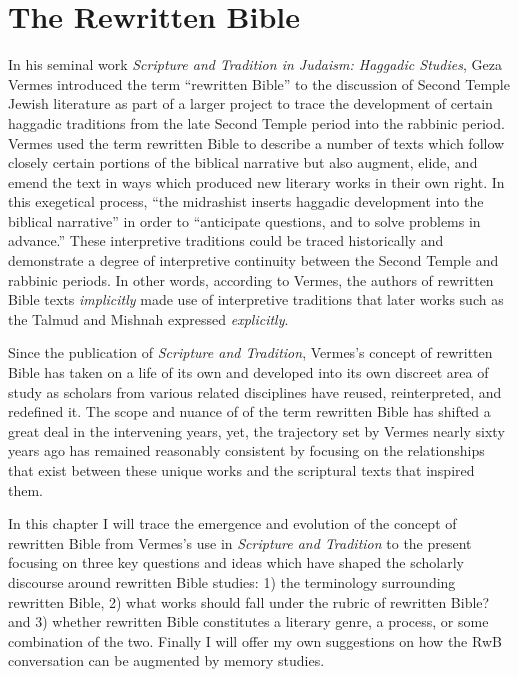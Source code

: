 \chapter{The Rewritten Bible}\label{the-rwb}

In his seminal work
\emph{Scripture and Tradition in Judaism: Haggadic Studies}, Geza Vermes
introduced the term ``rewritten Bible'' to the discussion of
Second Temple Jewish literature as part of a larger project to trace the
development of certain haggadic traditions from the late Second Temple
period into the rabbinic period. Vermes used the term rewritten Bible to
describe a number of texts which follow closely certain portions of the
biblical narrative but also augment, elide, and emend the text in ways
which produced new literary works in their own right. In this exegetical
process, ``the midrashist inserts haggadic development into the biblical
narrative'' in order to ``anticipate questions, and to solve problems in
advance.''\autocites[95]{vermes1961}[see also][]{vermes_zsengeller2014}
These interpretive traditions could be traced historically and
demonstrate a degree of interpretive continuity between the
Second Temple and rabbinic periods. In other words, according to Vermes,
the authors of rewritten Bible texts \emph{implicitly} made use of
interpretive traditions that later works such as the Talmud and Mishnah
expressed \emph{explicitly}.

Since the publication of \emph{Scripture and Tradition}, Vermes's
concept of rewritten Bible has taken on a life of its own and developed
into its own discreet area of study as scholars from various related
disciplines have reused, reinterpreted, and redefined it. The scope and
nuance of of the term rewritten Bible has shifted a great deal in the
intervening years, yet, the trajectory set by Vermes nearly sixty years
ago has remained reasonably consistent by focusing on the relationships
that exist between these unique works and the scriptural texts that
inspired them.

In this chapter I will trace the emergence and evolution of the concept
of rewritten Bible from Vermes's use in \emph{Scripture and Tradition}
to the present focusing on three key questions and ideas which have
shaped the scholarly discourse around rewritten Bible studies: 1) the
terminology surrounding rewritten Bible, 2) what works should fall under
the rubric of rewritten Bible? and 3) whether rewritten Bible
constitutes a literary genre, a process, or some combination of the two.
Finally I will offer my own suggestions on how the RwB conversation can
be augmented by memory studies.


